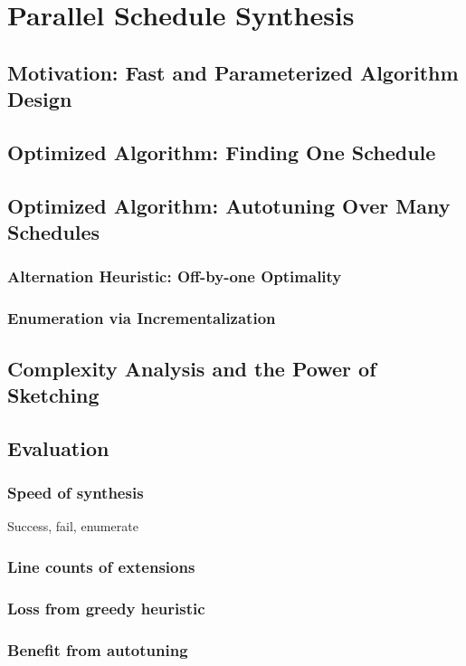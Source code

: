 \chapter{Parallel Schedule Synthesis}

\section{Motivation: Fast and Parameterized Algorithm Design}
\section{Optimized Algorithm: Finding One Schedule}
\section{Optimized Algorithm: Autotuning Over Many Schedules}
\subsection{Alternation Heuristic: Off-by-one Optimality}
\subsection{Enumeration via Incrementalization}
\section{Complexity Analysis and the Power of Sketching}
\section{Evaluation}
\subsection{Speed of synthesis}
Success, fail, enumerate
\subsection{Line counts of extensions}
\subsection{Loss from greedy heuristic}
\subsection{Benefit from autotuning}

